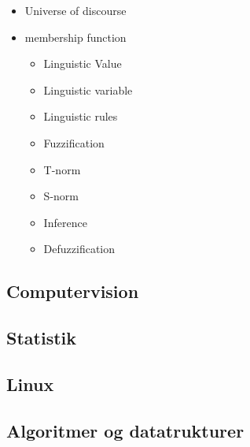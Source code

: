 \documentclass[a4paper,11pt]{article}
\begin{document}
\begin{itemize}
\begin{itemize}
\begin{itemize}
                    \item Universe of discourse
                    \item membership function
                        \begin{itemize}
                            \item Linguistic Value
                            \item Linguistic variable
                            \item Linguistic rules
                        \end{itemize}
                        \begin{itemize}
                            \item Fuzzification 
                            \item T-norm
                            \item S-norm
                            \item Inference
                            \item Defuzzification
                                
                        \end{itemize}

                \end{itemize}
        \end{itemize}
        
\end{itemize}

\subsection{Computervision}
\subsection{Statistik}
\subsection{Linux}
\subsection{Algoritmer og datatrukturer}
\end{document}
